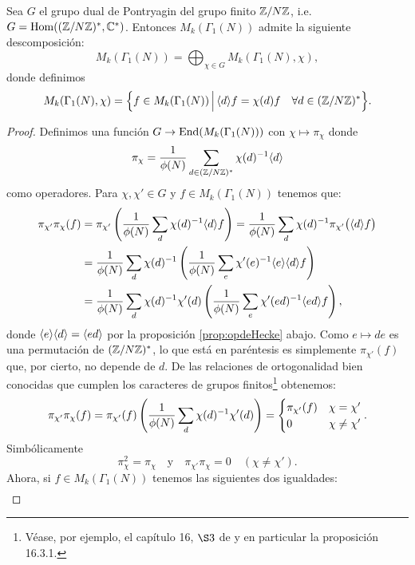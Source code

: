 \documentclass[../../tesis_maestria]{subfiles}
\begin{document}
\begin{prop}\label{prop:chieigenespacios}
  Sea $G$ el grupo dual de Pontryagin del grupo finito $\mathbb{Z}/N\mathbb{Z}$, i.e.  $G=\mathrm{Hom}((\mathbb{Z}/N\mathbb{Z})^*,\mathbb{C}^*)$.
  Entonces $M_k(\Gamma_1(N))$ admite la siguiente descomposici\'on:
  \[
    M_k(\Gamma_1(N))=\bigoplus_{\chi\in G}M_k(\Gamma_1(N),\chi),
  \]
  donde definimos
  \[
    M_k(\Gamma_1(N),\chi)=
    \Big\{f\in M_k(\Gamma_1(N)) \,\Big|\, \langle d \rangle f=\chi(d)f\quad\forall d\in(\mathbb{Z}/N\mathbb{Z})^*\Big\}.
  \]
\end{prop}
\begin{proof}
  Definimos una funci\'on $G\rightarrow\mathrm{End}(M_k(\Gamma_1(N)))$ con $\chi\mapsto \pi_{\chi}$ donde
  \[
    \pi_{\chi}=\frac{1}{\phi(N)}\sum_{d\in(\mathbb{Z}/N\mathbb{Z})^*}\chi(d)^{-1}\langle d \rangle
  \]
  como operadores. Para $\chi,\chi'\in G$ y $f\in M_k(\Gamma_1(N))$ tenemos que:
  \begin{align*}
    \pi_{\chi'}\pi_{\chi}(f)
    &=\pi_{\chi'}\left( \frac{1}{\phi(N)}\sum_d\chi(d)^{-1}\langle d \rangle f \right)
      =\frac{1}{\phi(N)}\sum_d\chi(d)^{-1}\pi_{\chi'}\big(\langle d \rangle f\big)\\
    &=\frac{1}{\phi(N)}\sum_d\chi(d)^{-1}\left( \frac{1}{\phi(N)}\sum_e\chi'(e)^{-1}\langle e \rangle\langle d \rangle f \right)\\
    &=\frac{1}{\phi(N)}\sum_d\chi(d)^{-1}\chi'(d)
      \left( \frac{1}{\phi(N)}\sum_e\chi'(ed)^{-1}\langle ed \rangle f \right),
  \end{align*}
  donde $\langle e \rangle\langle d \rangle=\langle ed \rangle$ por la proposici\'on \ref{prop:opdeHecke} abajo.  
  Como $e\mapsto de$ es una permutaci\'on de $(\mathbb{Z}/N\mathbb{Z})^*$, lo que est\'a en par\'entesis es
  simplemente $\pi_{\chi'}(f)$ que, por cierto, no depende de $d$. De las relaciones de
  ortogonalidad bien conocidas que cumplen los caracteres de grupos finitos\footnote{V\'ease, por ejemplo,
    el cap\'itulo 16, $\S3$ de \cite{IrelandRosenACITMNT} y en particular la proposici\'on 16.3.1.}
  obtenemos:
  \[
    \pi_{\chi'}\pi_{\chi}(f)=\pi_{\chi'}(f)\left( \frac{1}{\phi(N)}\sum_d\chi(d)^{-1}\chi'(d) \right)=
    \begin{cases}
      \pi_{\chi'}(f) &\chi=\chi'\\
      0 &\chi\neq\chi'
    \end{cases}.
  \]
  Simb\'olicamente
  \begin{equation}
    \label{eq:proyeccionpichi}
    \pi_{\chi}^2=\pi_{\chi}\quad\text{y}\quad \pi_{\chi'}\pi_{\chi}=0 \quad (\chi\neq\chi').
  \end{equation}
  Ahora, si $f\in M_k(\Gamma_1(N))$ tenemos las siguientes dos igualdades:
  \begin{align*}

\end{align*}
\end{proof}
\end{document}
